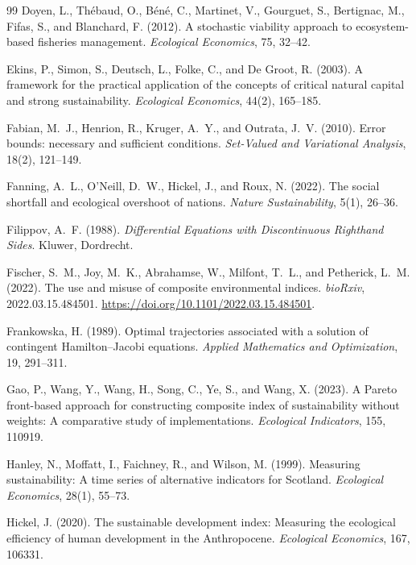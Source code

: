 \documentclass[preprint,11pt,authoryear]{elsarticle}
\theoremstyle{definition}
\theoremstyle{remark}
\begin{document}
\begin{thebibliography}{99}
 Doyen, L., Th\'ebaud, O., B\'en\'e, C., Martinet, V., Gourguet, S., Bertignac, M., Fifas, S., and Blanchard, F. (2012). A stochastic viability approach to ecosystem-based fisheries management. \emph{Ecological Economics}, 75, 32--42.

 Ekins, P., Simon, S., Deutsch, L., Folke, C., and De Groot, R. (2003). A framework for the practical application of the concepts of critical natural capital and strong sustainability. \emph{Ecological Economics}, 44(2), 165--185.

 Fabian, M.~J., Henrion, R., Kruger, A.~Y., and Outrata, J.~V. (2010). Error bounds: necessary and sufficient conditions. \emph{Set-Valued and Variational Analysis}, 18(2), 121--149.

 Fanning, A.~L., O'Neill, D.~W., Hickel, J., and Roux, N. (2022). The social shortfall and ecological overshoot of nations. \emph{Nature Sustainability}, 5(1), 26--36.

 Filippov, A.~F. (1988). \emph{Differential Equations with Discontinuous Righthand Sides}. Kluwer, Dordrecht.

 Fischer, S.~M., Joy, M.~K., Abrahamse, W., Milfont, T.~L., and Petherick, L.~M. (2022). The use and misuse of composite environmental indices. \emph{bioRxiv}, 2022.03.15.484501. \url{https://doi.org/10.1101/2022.03.15.484501}.

 Frankowska, H. (1989). Optimal trajectories associated with a solution of contingent Hamilton--Jacobi equations. \emph{Applied Mathematics and Optimization}, 19, 291--311.

 Gao, P., Wang, Y., Wang, H., Song, C., Ye, S., and Wang, X. (2023). A Pareto front-based approach for constructing composite index of sustainability without weights: A comparative study of implementations. \emph{Ecological Indicators}, 155, 110919.

 Hanley, N., Moffatt, I., Faichney, R., and Wilson, M. (1999). Measuring sustainability: A time series of alternative indicators for Scotland. \emph{Ecological Economics}, 28(1), 55--73.

 Hickel, J. (2020). The sustainable development index: Measuring the ecological efficiency of human development in the Anthropocene. \emph{Ecological Economics}, 167, 106331.


\end{thebibliography}
\end{document}
